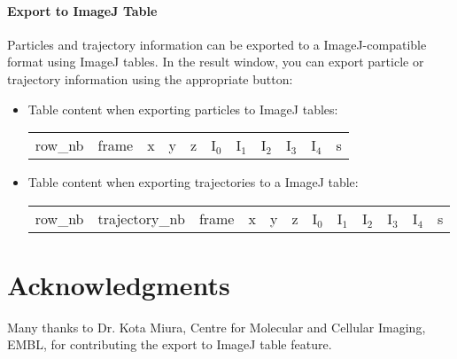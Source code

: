 \documentclass{scrartcl}
\begin{document}
\paragraph{Export to ImageJ Table}
Particles and trajectory information can be exported to a ImageJ-compatible format using ImageJ tables. In the result window, you can export particle or trajectory information using the appropriate button:
\begin{itemize}
\item Table content when exporting particles to ImageJ tables:\\
  \begin{table}[ht]
    \ttfamily
    \begin{tabular}{*{11}{l}}	
      row\_nb & frame & x & y & z & I$_0$ & I$_1$ & I$_2$ & I$_3$ & I$_4$ & s					
    \end{tabular}
  \end{table}
\item Table content when exporting trajectories to a ImageJ table:\\
  \begin{table}[ht]
    \ttfamily
    \begin{tabular}{*{12}{l}}	
      row\_nb & trajectory\_nb & frame & x & y & z & I$_0$ & I$_1$ & I$_2$ & I$_3$ & I$_4$ & s					
    \end{tabular}
  \end{table}
\end{itemize}
\section{Acknowledgments}
Many thanks to Dr. Kota Miura, Centre for Molecular and Cellular Imaging, EMBL, for contributing the export to ImageJ table feature.




\end{document}
